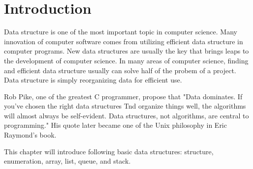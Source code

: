 \documentclass[../main.tex]{subfiles}
\begin{document}
\section{Introduction}
Data structure is one of the most important topic in computer science. Many
innovation of computer software comes from utilizing efficient data structure in
computer programs. New data structures are usually the key that brings leaps to
the development of computer science. In many areas of computer science, finding
and efficient data structure usually can solve half of the probem of a project.
Data structure is simply reorganizing data for efficient use.

Rob Pike, one of the greatest C programmer, propose that "Data dominates. If
you've chosen the right data structures Tnd organize things well, the algorithms
will almost always be self-evident. Data structures, not algorithms, are central
to programming." His quote later became one of the Unix philosophy in Eric
Raymond's book.

This chapter will introduce following basic data structures: structure, enumeration,
array, list, queue, and stack.
\end{document}
